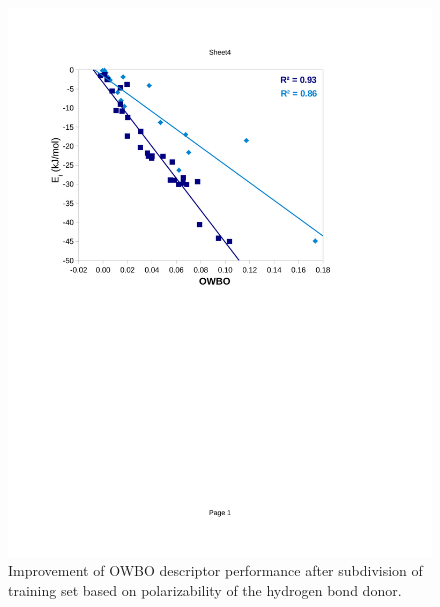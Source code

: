 \documentclass[11pt]{report}
\begin{document}
\begin{figure}
  \centering
  \includegraphics[width=0.65\linewidth,trim=2cm 13.5cm 5.2cm 3cm, clip=true]{images/owbo_opt.pdf}
   \caption[Improvement of OWBO descriptor performance]{Improvement of OWBO descriptor performance
   after subdivision of training set based on polarizability of
   the hydrogen bond donor.}
  \label{f:HBP-owbo_imp}
\end{figure}
\end{document}
